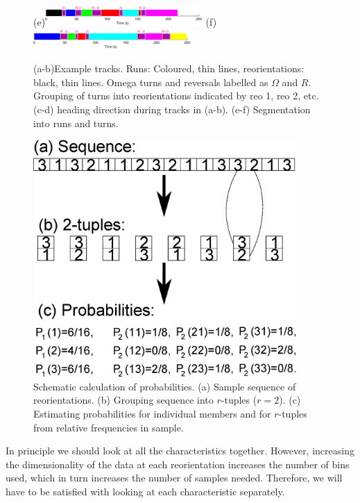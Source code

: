 \documentclass[12pt]{article}
\begin{document}
\begin{figure}
  (e)\includegraphics[width=6cm]{track2_type.eps}
  (f)\includegraphics[width=6cm]{track4_type.eps}
  \caption[Example tracks.]{(a-b)Example tracks. Runs: Coloured, thin lines, reorientations: black, thin lines. Omega turns and reversals labelled as $\Omega$ and $R$. Grouping of turns into reorientations indicated by reo 1, reo 2, etc.
  (c-d) heading direction during tracks in (a-b).
  (e-f) Segmentation into runs and turns.  } \label{fig:tracks}
\end{figure}



\begin{figure}
  \begin{center}
    \includegraphics[width=10cm]{schematic.eps}
  \end{center}
  \caption[Schematic calculation of probabilities.]{Schematic calculation of probabilities. (a) Sample sequence of reorientations. (b) Grouping sequence into $r$-tuples ($r=2$). (c) Estimating probabilities for individual members and for $r$-tuples from relative frequencies in sample.} \label{fig:schematic}
\end{figure}

In principle we should look at all the characteristics together. However, increasing the dimensionality of the data at each reorientation increases the number of bins used, which in turn increases the number of samples needed. Therefore, we will have to be satisfied with looking at each characteristic separately.
\end{document}
